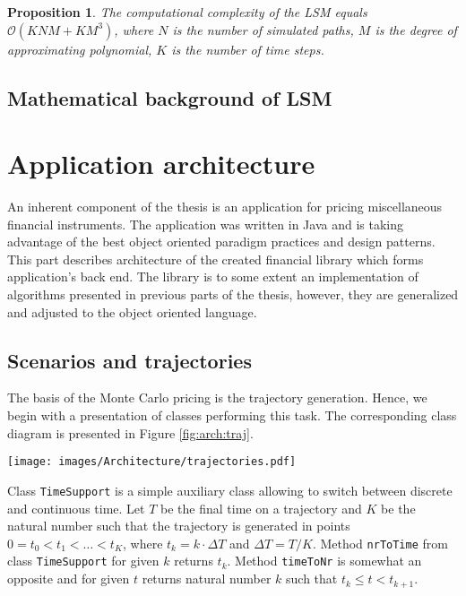 \documentclass[a4paper,11pt, twoside]{book}
\newtheorem{prop}[thm]{Proposition}
\theoremstyle{definition}
\theoremstyle{remark}
\begin{document}
\begin{prop}
 The computational complexity of the LSM equals $\mathcal{O}(KNM + KM^3)$, where $N$ is the number of simulated paths, $M$ is the degree of approximating polynomial, $K$ is the number of time steps.
\end{prop}

\section{Mathematical background of LSM}

\chapter{Application architecture}
An inherent component of the thesis is an application for pricing miscellaneous financial instruments. The application was written in Java and is taking advantage of the best object oriented paradigm practices and design patterns. This part describes architecture of the created financial library which forms application's back end. The library is to some extent an implementation of algorithms presented in previous parts of the thesis, however, they are generalized and adjusted to the object oriented language.

\section{Scenarios and trajectories}
The basis of the Monte Carlo pricing is the trajectory generation. Hence, we begin with a presentation of classes performing this task. The corresponding class diagram is presented in Figure \ref{fig:arch:traj}.

\begin{sidewaysfigure}
\centering
 \texttt{[image: images/Architecture/trajectories.pdf]}
\caption{Class diagram presenting classes designated for scenario generation.}
\label{fig:arch:traj}
\end{sidewaysfigure}

Class \texttt{TimeSupport} is a simple auxiliary class allowing to switch between discrete and continuous time. Let $T$ be the final time on a trajectory and $K$ be the natural number such that the trajectory is generated in points $0 = t_0 < t_1 < \ldots < t_K$, where $t_k = k \cdot \Delta T$ and $\Delta T = T / K$. Method \texttt{nrToTime} from class \texttt{TimeSupport} for given $k$ returns $t_k$. Method \texttt{timeToNr} is somewhat an opposite and for given $t$ returns natural number $k$ such that $t_k \leq t < t_{k+1}$. 
\end{document}
